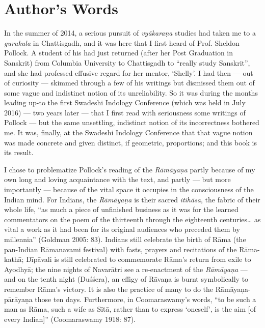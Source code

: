 \chapter*{Author's Words}\label{authors-words}


In the summer of 2014, a serious pursuit of {\sl vyākaraṇa} studies had taken me to a {\sl gurukula} in Chattisgadh, and it was here that I first heard of Prof. Sheldon Pollock. A student of his had just returned (after her Post Graduation in Sanskrit) from Columbia University to Chattisgadh to “really study Sanskrit”, and she had professed effusive regard for her mentor, ‘Shelly’. I had then --- out of curiosity --- skimmed through a few of his writings but dismissed them out of some vague and indistinct notion of its unreliability. So it was during the months leading up-to the first Swadeshi Indology Conference (which was held in July 2016) --- two years later --- that I first read with seriousness some writings of Pollock --- but the same unsettling, indistinct notion of its incorrectness bothered me. It was, finally, at the Swadeshi Indology Conference that that vague notion was made concrete and given distinct, if geometric, proportions; and this book is its result.  

I chose to problematize Pollock’s reading of the {\sl Rāmāyaṇa} partly because of my own long and loving acquaintance with the text, and partly --- but more importantly --- because of the vital space it occupies in the consciousness of the Indian mind. For Indians, the {\sl Rāmāyaṇa} is their sacred {\sl itihāsa}, the fabric of their whole life, “as much a piece of unfinished business as it was for the learned commentators on the poem of the thirteenth through the eighteenth centuries… as vital a work as it had been for its original audiences who preceded them by millennia” (Goldman 2005: 83). Indians still celebrate the birth of Rāma (the pan-Indian Rāmanavami festival) with fasts, prayers and recitations of the Rāma-kathā; Dīpāvali is still celebrated to commemorate Rāma’s return from exile to Ayodhyā; the nine nights of Navarātri see a re-enactment of the {\sl Rāmāyaṇa} --- and on the tenth night (Duśśera), an effigy of Rāvaṇa is burnt symbolically to remember Rāma’s victory. It is also the practice of many to do the Rāmāyaṇa-pārāyaṇa those ten days. Furthermore, in Coomaraswamy’s words, “to be such a man as Rāma, such a wife as Sītā, rather than to express ‘oneself’, is the aim [of every Indian]” (Coomaraswamy 1918: 87).

